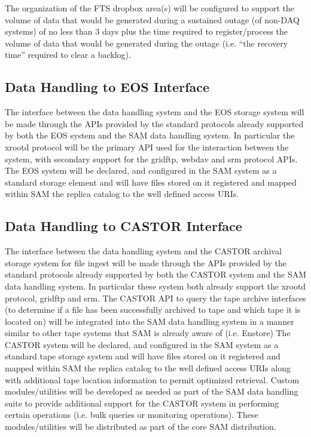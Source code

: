 \documentclass[pdftex,12pt,letter]{article}
\begin{document}
The organization of the FTS dropbox area(s) will be configured to support the volume of data that would be generated during a sustained outage (of non-DAQ systems) of no less than 3 days plus the time required to register/process the volume of data that would be generated during the outage (i.e. “the recovery time” required to clear a backlog).

\subsection{Data Handling to EOS Interface}
The interface between the data handling system and the EOS storage system will be made through the APIs provided by the standard protocols already supported by both the EOS system and the SAM data handling system.  In particular the xrootd protocol will be the primary API used for the interaction between the system, with secondary support for the gridftp, webdav and srm protocol APIs.  The EOS system will be declared, and configured in the SAM system as a standard storage element and will have files stored on it registered and mapped within SAM the replica catalog to the well defined access URIs. 

\subsection{Data Handling to CASTOR Interface}
The interface between the data handling system and the CASTOR archival storage system for file ingest will be made through the APIs provided by the standard protocols already supported by both the CASTOR system and the SAM data handling system.  In particular these system both already support the xrootd protocol, gridftp and srm.  The CASTOR API to query the tape archive interfaces (to determine if a file has been successfully archived to tape and which tape it is located on) will be integrated into the SAM data handling system in a manner similar to other tape systems that SAM is already aware of (i.e. Enstore)   The CASTOR system will be declared, and configured in the SAM system as a standard tape storage system and will have files stored on it registered and mapped within SAM the replica catalog to the well defined access URIs along with additional tape location information to permit optimized retrieval.  Custom modules/utilities will be developed as needed as part of the SAM data handling suite to provide additional support for the CASTOR system in performing certain operations (i.e. bulk queries or monitoring operations).  These modules/utilities will be distributed as part of the core SAM distribution.
\end{document}
